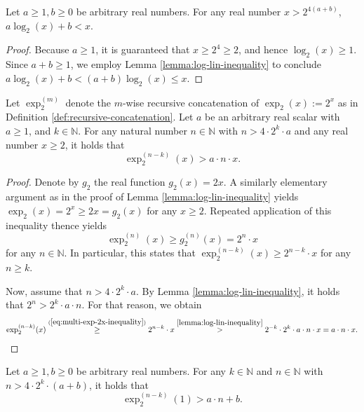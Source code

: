 \begin{corollary}
	\label{cor:log-lin-add-inequality}
	Let $a\geq 1,b\geq 0$ be arbitrary real numbers.
	For any real number $x> 2^{4(a+b)}$, $a\log_2(x)+b < x$.
\end{corollary}
\begin{proof}
	Because $a\geq 1$, it is guaranteed that $x\geq 2^4 \geq 2$, and hence $\log_2(x)\geq 1$. 
	Since $a+b\geq 1$, we employ Lemma \ref{lemma:log-lin-inequality} to conclude $a\log_2(x)+b < (a+b)\log_2(x)\leq x$.
\end{proof}

\begin{lemma}
	\label{lemma:cascade-exp-inequality}
	Let $\exp_2^{(m)}$ denote the $m$-wise recursive concatenation of $\exp_2(x):=2^x$ as in Definition \ref{def:recursive-concatenation}.
	Let $a$ be an arbitrary real scalar with $a\geq 1$, and $k\in\mathbb{N}$. 
	For any natural number $n\in\mathbb{N}$ with $n>4\cdot 2^k\cdot a$ and any real number $x\geq 2$, it holds that
	\begin{equation}
		\exp_2^{(n-k)}(x) > a\cdot n \cdot x.
	\end{equation}
\end{lemma}
\begin{proof}
	Denote by $g_2$ the real function $g_2(x)=2x$.
	A similarly elementary argument as in the proof of Lemma \ref{lemma:log-lin-inequality} yields $\exp_2(x)=2^x\geq 2x=g_2(x)$ for any $x\geq 2$.
	Repeated application of this inequality thence yields 
	\begin{equation}
		\label{eq:multi-exp-2x-inequality}
		\exp^{(n)}_2(x) \geq  g^{(n)}_2(x)= 2^n\cdot x 
	\end{equation}
	for any $n\in\mathbb{N}$.
	In particular, this states that $\exp^{(n-k)}_2(x) \geq 2^{n-k}\cdot x$ for any $n\geq k$.
	
	Now, assume that $n>4\cdot 2^k\cdot a$.
	By Lemma \ref{lemma:log-lin-inequality}, it holds that $2^n> 2^k\cdot a\cdot n$.
	For that reason, we obtain
	\begin{align}
		\label{eq:cascade-exp-inequality}
		\exp^{(n-k)}_2(x) \overset{(\ref{eq:multi-exp-2x-inequality})}{\geq} 2^{n-k}\cdot x\overset{\ref{lemma:log-lin-inequality}}{>} 2^{-k}\cdot 2^k\cdot a\cdot n \cdot x = a\cdot n\cdot x.
	\end{align}
	
\end{proof}
\begin{corollary}
	\label{cor:cascade-exp-inequality-basis}
	Let $a\geq 1,b\geq 0$ be arbitrary real numbers.
	For any $k\in\mathbb{N}$ and $n\in\mathbb{N}$ with $n>4\cdot 2^k\cdot (a+b)$, it holds that
	\begin{equation}
		\exp^{(n-k)}_2(1) > a\cdot n + b.
	\end{equation}
\end{corollary}
